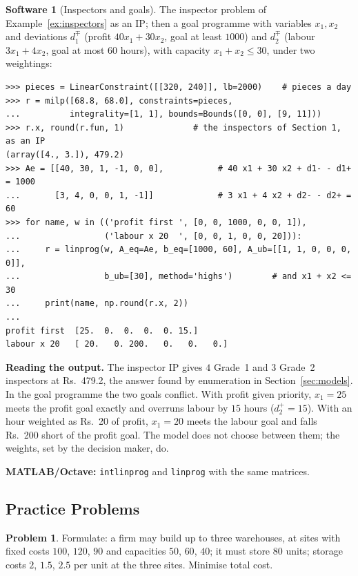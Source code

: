 \documentclass[11pt,a4paper]{article}
\numberwithin{equation}{section}
\theoremstyle{definition}
\newtheorem{software}[thm]{Software}
\newtheorem{problemx}{Problem}[subsection]
\newenvironment{problem}{\begin{problemx}}{\end{problemx}}
\begin{document}
\begin{software}[Inspectors and goals]
\label{sw:milp}
The inspector problem of Example~\ref{ex:inspectors} as an IP; then a goal programme with variables $x_1, x_2$ and deviations $d_1^\mp$ (profit $40x_1 + 30x_2$, goal at least $1000$) and $d_2^\mp$ (labour $3x_1 + 4x_2$, goal at most $60$ hours), with capacity $x_1 + x_2 \leq 30$, under two weightings:
{\small\begin{verbatim}
>>> pieces = LinearConstraint([[320, 240]], lb=2000)    # pieces a day
>>> r = milp([68.8, 68.0], constraints=pieces,
...          integrality=[1, 1], bounds=Bounds([0, 0], [9, 11]))
>>> r.x, round(r.fun, 1)              # the inspectors of Section 1, as an IP
(array([4., 3.]), 479.2)
>>> Ae = [[40, 30, 1, -1, 0, 0],           # 40 x1 + 30 x2 + d1- - d1+ = 1000
...       [3, 4, 0, 0, 1, -1]]             # 3 x1 + 4 x2 + d2- - d2+ = 60
>>> for name, w in (('profit first ', [0, 0, 1000, 0, 0, 1]),
...                 ('labour x 20  ', [0, 0, 1, 0, 0, 20])):
...     r = linprog(w, A_eq=Ae, b_eq=[1000, 60], A_ub=[[1, 1, 0, 0, 0, 0]],
...                 b_ub=[30], method='highs')        # and x1 + x2 <= 30
...     print(name, np.round(r.x, 2))
...
profit first  [25.  0.  0.  0.  0. 15.]
labour x 20   [ 20.   0. 200.   0.   0.   0.]
\end{verbatim}}
\textbf{Reading the output.} The inspector IP gives $4$ Grade~1 and $3$ Grade~2 inspectors at Rs.~479.2, the answer found by enumeration in Section~\ref{sec:models}. In the goal programme the two goals conflict. With profit given priority, $x_1 = 25$ meets the profit goal exactly and overruns labour by $15$ hours ($d_2^+ = 15$). With an hour
weighted as Rs.~20 of profit, $x_1 = 20$ meets the labour goal and falls Rs.~200 short of the profit goal. The model does not choose between them; the weights, set by the decision maker, do.

\textbf{MATLAB/Octave:} \texttt{intlinprog} and \texttt{linprog} with the same matrices.
\end{software}

\subsection{Practice Problems}

\begin{problem}
Formulate: a firm may build up to three warehouses, at sites with fixed costs $100$, $120$, $90$ and capacities $50$, $60$, $40$; it must store $80$ units; storage costs $2$, $1.5$, $2.5$ per unit at the three sites. Minimise total cost.
\end{problem}
\end{document}
